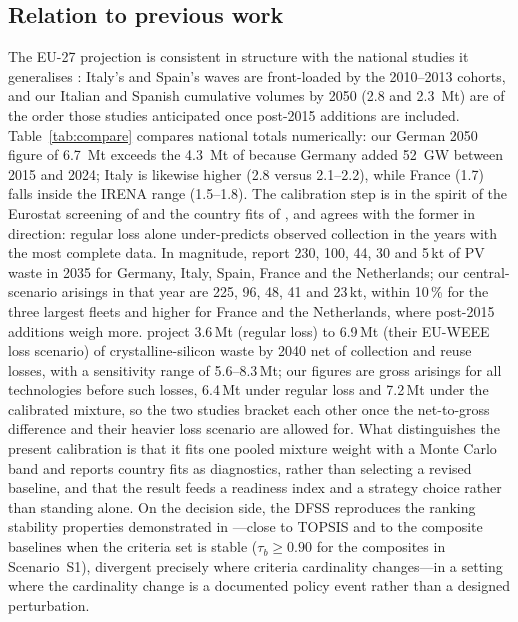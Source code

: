 \documentclass[a4paper,fleqn]{cas-sc}
\begin{document}
\subsection{Relation to previous work}
The EU-27 projection is consistent in structure with the national studies it generalises \citep{paiano2015,santos2018}: Italy's and Spain's waves are front-loaded by the 2010--2013 cohorts, and our Italian and Spanish cumulative volumes by 2050 (2.8 and \SI{2.3}{Mt}) are of the order those studies anticipated once post-2015 additions are included. Table~\ref{tab:compare} compares national totals numerically: our German 2050 figure of \SI{6.7}{Mt} exceeds the \SI{4.3}{Mt} of \citet{irena2016} because Germany added \SI{52}{GW} between 2015 and 2024; Italy is likewise higher (2.8 versus 2.1--2.2), while France (1.7) falls inside the IRENA range (1.5--1.8). The calibration step is in the spirit of the Eurostat screening of \citet{kastanaki2026} and the country fits of \citet{pitacco2026}, and agrees with the former in direction: regular loss alone under-predicts observed collection in the years with the most complete data. In magnitude, \citet{pitacco2026} report 230, 100, 44, 30 and 5\,kt of PV waste in 2035 for Germany, Italy, Spain, France and the Netherlands; our central-scenario arisings in that year are 225, 96, 48, 41 and 23\,kt, within 10\,\% for the three largest fleets and higher for France and the Netherlands, where post-2015 additions weigh more. \citet{nagarajan2026} project 3.6\,Mt (regular loss) to 6.9\,Mt (their EU-WEEE loss scenario) of crystalline-silicon waste by 2040 net of collection and reuse losses, with a sensitivity range of 5.6--8.3\,Mt; our figures are gross arisings for all technologies before such losses, 6.4\,Mt under regular loss and 7.2\,Mt under the calibrated mixture, so the two studies bracket each other once the net-to-gross difference and their heavier loss scenario are allowed for. What distinguishes the present calibration is that it fits one pooled mixture weight with a Monte Carlo band and reports country fits as diagnostics, rather than selecting a revised baseline, and that the result feeds a readiness index and a strategy choice rather than standing alone. On the decision side, the DFSS reproduces the ranking stability properties demonstrated in \citet{SAEED2026200504}---close to TOPSIS and to the composite baselines when the criteria set is stable ($\tau_b\ge0.90$ for the composites in Scenario~S1), divergent precisely where criteria cardinality changes---in a setting where the cardinality change is a documented policy event rather than a designed perturbation.
\end{document}
